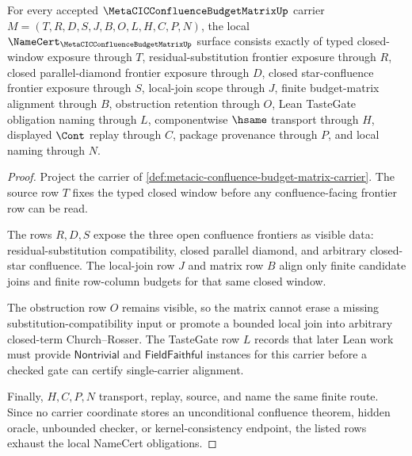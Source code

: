 \begin{theorem}
\label{thm:metacic-confluence-budget-matrix-namecert-obligations}
For every accepted $\MetaCICConfluenceBudgetMatrixUp$ carrier $M=(T,R,D,S,J,B,O,L,H,C,P,N)$, the local $\NameCert_{\MetaCICConfluenceBudgetMatrixUp}$ surface consists exactly of typed closed-window exposure through $T$, residual-substitution frontier exposure through $R$, closed parallel-diamond frontier exposure through $D$, closed star-confluence frontier exposure through $S$, local-join scope through $J$, finite budget-matrix alignment through $B$, obstruction retention through $O$, Lean TasteGate obligation naming through $L$, componentwise $\hsame$ transport through $H$, displayed $\Cont$ replay through $C$, package provenance through $P$, and local naming through $N$.
\end{theorem}
\begin{proof}
Project the carrier of \autoref{def:metacic-confluence-budget-matrix-carrier}. The source row $T$ fixes the typed closed window before any confluence-facing frontier row can be read.

The rows $R,D,S$ expose the three open confluence frontiers as visible data: residual-substitution compatibility, closed parallel diamond, and arbitrary closed-star confluence. The local-join row $J$ and matrix row $B$ align only finite candidate joins and finite row-column budgets for that same closed window.

The obstruction row $O$ remains visible, so the matrix cannot erase a missing substitution-compatibility input or promote a bounded local join into arbitrary closed-term Church--Rosser. The TasteGate row $L$ records that later Lean work must provide $\mathsf{Nontrivial}$ and $\mathsf{FieldFaithful}$ instances for this carrier before a checked gate can certify single-carrier alignment.

Finally, $H,C,P,N$ transport, replay, source, and name the same finite route. Since no carrier coordinate stores an unconditional confluence theorem, hidden oracle, unbounded checker, or kernel-consistency endpoint, the listed rows exhaust the local NameCert obligations.
\end{proof}


